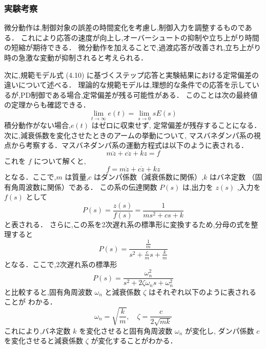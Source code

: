 \subsubsection{実験考察}
微分動作は,制御対象の誤差の時間変化を考慮し,制御入力を調整するものである．
これにより応答の速度が向上し,オーバーシュートの抑制や立ち上がり時間の短縮が期待できる．
微分動作を加えることで,過渡応答が改善され,立ち上がり時の急激な変動が抑制されると考えられる．

次に,規範モデル式 (4.10) に基づくステップ応答と実験結果における定常偏差の違いについて述べる．
理論的な規範モデルは,理想的な条件での応答を示しているが,PD制御である場合,定常偏差が残る可能性がある．
このことは次の最終値の定理からも確認できる．
\[
  \lim_{t \to \infty} e(t) = \lim_{s \to 0} s E(s)
\]
積分動作がない場合,\( e(t) \) はゼロに収束せず,
定常偏差が残存することになる．
次に,減衰係数を変化させたときのアームの挙動について,
マスバネダンパ系の視点から考察する．マスバネダンパ系の運動方程式は以下のように表される．
\[
  m \ddot{z} + c \dot{z} + k z = f
\]
これを \( f \) について解くと,
\[
  f = m \ddot{z} + c \dot{z} + k z
\]
となる．ここで,\( m \) は質量,\( c \) はダンパ係数（減衰係数に関係）,\( k \) はバネ定数
（固有角周波数に関係）である．
この系の伝達関数 \( P(s) \) は,出力を \( z(s) \) ,入力を \( f(s) \) として
\[
  P(s) = \frac{z(s)}{f(s)} = \frac{1}{m s^2 + c s + k}
\]
と表される．
さらに,この系を2次遅れ系の標準形に変換するため,分母の式を整理すると
\[
  P(s) = \frac{\frac{1}{m}}{s^2 + \frac{c}{m} s + \frac{k}{m}}
\]
となる．ここで,2次遅れ系の標準形
\[
  P(s) = \frac{\omega_n^2}{s^2 + 2 \zeta \omega_n s + \omega_n^2}
\]
と比較すると,固有角周波数 \( \omega_n \) と減衰係数 \( \zeta \) はそれぞれ以下のように表されることが
わかる．
\[
  \omega_n = \sqrt{\frac{k}{m}}, \quad \zeta = \frac{c}{2 \sqrt{m k}}
\]
これにより,バネ定数 \( k \) を変化させると固有角周波数 \( \omega_n \) が変化し,
ダンパ係数 \( c \) を変化させると減衰係数 \( \zeta \) が変化することがわかる．


